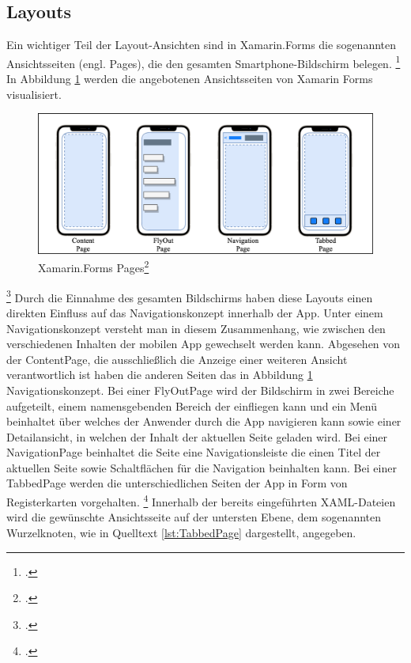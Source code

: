 \subsection{Layouts}
Ein wichtiger Teil der Layout-Ansichten sind in Xamarin.Forms die sogenannten Ansichtsseiten (engl. Pages),  die den gesamten Smartphone-Bildschirm belegen. \footcite[Vgl.][Abgerufen am \today]{MicrosoftXamPages2016} In Abbildung \ref{fig:Xamarin.Forms Pages} werden die angebotenen Ansichtsseiten von Xamarin Forms visualisiert. 
\begin{figure}[!ht]
 \includegraphics[width=\textwidth,height=\textheight,keepaspectratio]{Images/CrossPlattformFrameworks/XamarinFormsPages.png}
 \caption[Xamarin.Forms Pages]{Xamarin.Forms Pages\footcite{MicrosoftXamPages2016}}
 \label{fig:Xamarin.Forms Pages}
\end{figure}
\footcitetext[Abbildung in Anlehnung an ][Abgerufen am \today]{MicrosoftXamPages2016}
Durch die Einnahme des gesamten Bildschirms haben diese Layouts einen direkten Einfluss auf das Navigationskonzept innerhalb der App.  Unter einem Navigationskonzept versteht man in diesem Zusammenhang, wie zwischen den verschiedenen Inhalten der mobilen App gewechselt werden kann.  Abgesehen von der ContentPage,  die ausschließlich die Anzeige einer weiteren Ansicht verantwortlich ist haben die anderen Seiten das in Abbildung \ref{fig:Xamarin.Forms Pages} Navigationskonzept.  Bei einer \glq FlyOutPage\grq{} wird der Bildschirm in zwei Bereiche aufgeteilt, einem namensgebenden Bereich der einfliegen kann und ein Menü beinhaltet über welches der Anwender durch die App navigieren kann sowie einer Detailansicht,  in welchen der Inhalt der aktuellen Seite geladen wird.  Bei einer \glq NavigationPage\grq{} beinhaltet die Seite eine Navigationsleiste die einen Titel der aktuellen Seite sowie Schaltflächen für die Navigation beinhalten kann.  Bei einer \glq TabbedPage\grq{} werden die unterschiedlichen Seiten der App in Form von Registerkarten vorgehalten.  \footcite[Vgl.][Abgerufen am \today]{MicrosoftXamPages2016}
Innerhalb der bereits eingeführten XAML-Dateien wird die gewünschte Ansichtsseite auf der untersten Ebene,  dem sogenannten Wurzelknoten, wie in Quelltext \ref{lst:TabbedPage} dargestellt,  angegeben.  

